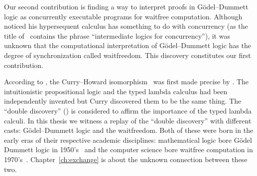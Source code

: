 Our second contribution is finding a way to interpret proofs in
G\"odel--Dummett logic as
concurrently executable programs for waitfree computation.
Although \citet{avron91} noticed his hypersequent calculus has something
to do with concurrency (as the title of~\citep{avron91} contains the phrase
``intermediate logics for concurrency''), it was unknown that
the computational interpretation of G\"odel--Dummett logic has
the degree of synchronization called waitfreedom.  This discovery
constitutes our first contribution.

According to \citet[p.97]{curryhoward},
the Curry--Howard isomorphism~\citep{curryhoward} was first made
precise by \citet[\textbf{9}E and
\textbf{9}F]{curry1974combinatory}.
The intuitionistic propositional logic and the typed lambda calculus
had been independently invented but Curry discovered them to be the same thing.
The ``double discovery'' (\citet{wadler2012propositions}) is considered
to affirm the importance of the typed lambda calculi.
In this thesis we witness a replay of the ``double discovery'' with
different casts: G\"odel--Dummett logic and the waitfreedom.
Both of these were born in the early eras of their respective academic
disciplines:
mathematical logic bore G\"odel Dummett logic in
1950's~\citep{dummett59}
and the computer science bore waitfree computation in
1970's~\citep{lamport1979make}.
Chapter~\ref{ch:exchange} is about the unknown connection between these two.

